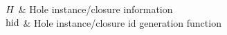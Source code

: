 \begin{table}[H]
  \centering
  \begin{tabular}{\colwidths}
    \hline\hline
    $H$ & Hole instance/closure information \\
    $\operatorname{hid}$ & Hole instance/closure id generation function \\
    \hline\hline
  \end{tabular}
  \caption{Hazel postprocessing}
  \label{tab:symb_hazel_dhexp}
\end{table}

\doublespacing

